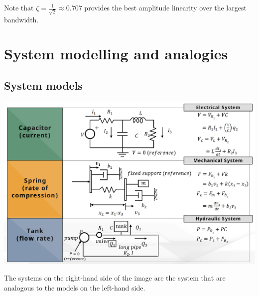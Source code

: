 \documentclass[11pt]{article}
\begin{document}
Note that \(\zeta = \frac{1}{\sqrt{2}} \approx 0.707\) provides the best amplitude linearity over the largest bandwidth.
\section{System modelling and analogies}
\label{sec:org1a24024}

\subsection{System models}
\label{sec:org079404c}
\begin{center}
\includegraphics[width=.9\linewidth]{./images/system-models.png}
\end{center}

The systems on the right-hand side of the image are the system that are analogous to the models on the left-hand side.

 \newpage
\end{document}
